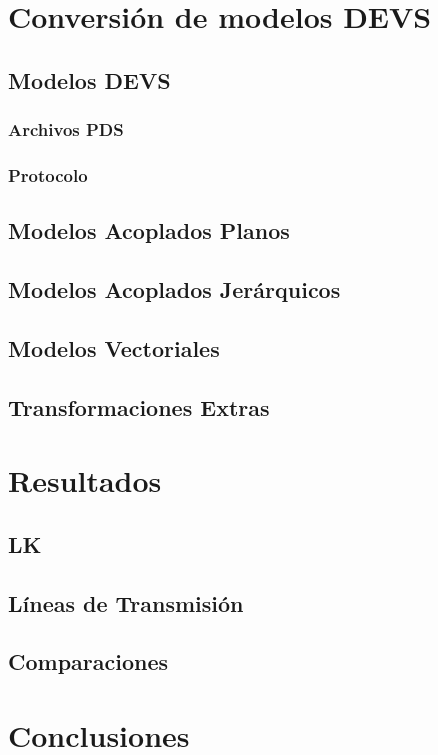 \section{Conversión de modelos DEVS}
	\subsection{Modelos DEVS}
		\subsubsection{Archivos PDS}
		\subsubsection{Protocolo}
	\subsection{Modelos Acoplados Planos}
	\subsection{Modelos Acoplados Jerárquicos }
	\subsection{Modelos Vectoriales}
	\subsection{Transformaciones Extras}
\section{Resultados}
	\subsection{LK}
	\subsection{Líneas de Transmisión}
	\subsection{Comparaciones}
\section{Conclusiones}




